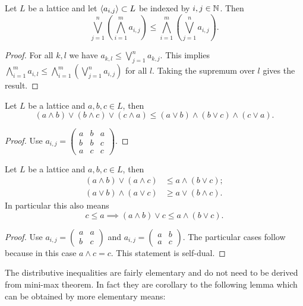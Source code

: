 \begin{proposition}
Let $L$ be a lattice and let $\langle a_{i,j} \rangle\subset L$ be indexed by $i,j\in \mathbb{N}$. Then
\[ \bigvee_{j=1}^n \left(\bigwedge_{i=1}^m a_{i,j}\right) \leq \bigwedge_{i=1}^m \left(\bigvee_{j=1}^n a_{i,j}\right). \]
\end{proposition}
\begin{proof}
For all $k,l$ we have $a_{k,l}\leq \bigvee_{j=1}^n a_{k,j}$. This implies $\bigwedge_{i=1}^m a_{i,l} \leq \bigwedge_{i=1}^m \left(\bigvee_{j=1}^n a_{i,j}\right)$ for all $l$. Taking the supremum over $l$ gives the result.
\end{proof}
\begin{corollary}
Let $L$ be a lattice and $a,b,c \in L$, then
\[ (a\wedge b) \vee (b\wedge c) \vee (c\wedge a) \leq (a\vee b)\wedge (b\vee c) \wedge (c\vee a). \]
\end{corollary}
\begin{proof}
Use $a_{i,j} = \begin{pmatrix}
a & b & a \\ b & b & c \\ a & c & c
\end{pmatrix}$.
\end{proof}
\begin{corollary} \label{corollary:distributiveInequality}
Let $L$ be a lattice and $a,b,c \in L$, then
\begin{align*}
(a\wedge b)\vee (a\wedge c) &\leq a\wedge (b \vee c); \\
(a\vee b)\wedge (a\vee c) &\geq a\vee (b \wedge c).
\end{align*}
In particular this also means
\[ c \leq a \implies (a\wedge b)\vee c \leq a\wedge (b\vee c).  \]
\end{corollary}
\begin{proof}
Use $a_{i,j} = \begin{pmatrix}
a & a \\ b & c 
\end{pmatrix}$ and $a_{i,j} = \begin{pmatrix}
a & b \\ a & c 
\end{pmatrix}$. The particular cases follow because in this case $a\wedge c = c$. This statement is self-dual.
\end{proof}
The distributive inequalities are fairly elementary and do not need to be derived from mini-max theorem. 
In fact they are corollary to the following lemma which can be obtained by more elementary means:
